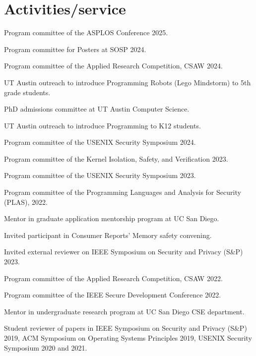 \section{Activities/service}


{ Program committee of the ASPLOS Conference 2025. }

{ Program committee for Posters at SOSP 2024. }

{ Program committee of the Applied Research Competition, CSAW 2024. }

{ UT Austin
outreach to introduce Programming Robots (Lego Mindstorm) to 5th grade students.
}

{ PhD admissions committee at UT Austin Computer Science. }

{ UT Austin
outreach to introduce Programming to K12 students. }

{ Program committee of the USENIX Security Symposium 2024. }

{ Program committee of the Kernel Isolation, Safety, and Verification 2023. }

{ Program committee of the USENIX Security Symposium 2023. }

{ Program committee of the Programming Languages and Analysis for Security (PLAS), 2022. }

{ Mentor in 
graduate application mentorship program at UC San Diego. }

{ Invited participant in Consumer Reports' Memory safety convening. }

{ Invited external reviewer on IEEE Symposium on Security and Privacy (S\&P) 2023.}

{ Program committee of the Applied Research Competition, CSAW 2022. }

{ Program committee of the IEEE Secure Development Conference 2022. }

{ Mentor in  undergraduate research program at UC San Diego CSE department. }

{ Student reviewer of papers in IEEE Symposium on Security and Privacy (S\&P)
2019, ACM Symposium on Operating Systems Principles 2019, USENIX Security
Symposium 2020 and 2021. }
